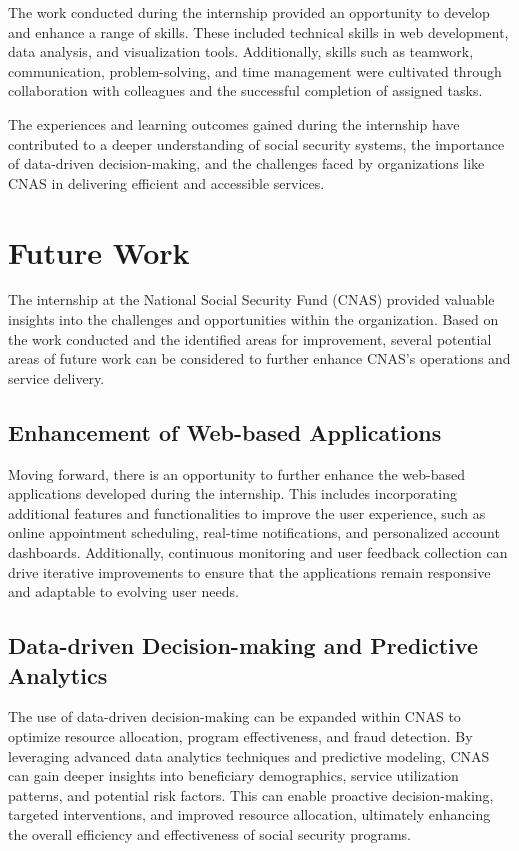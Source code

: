 The work conducted during the internship provided an opportunity to develop and enhance a range of skills. These included technical skills in web development, data analysis, and visualization tools. Additionally, skills such as teamwork, communication, problem-solving, and time management were cultivated through collaboration with colleagues and the successful completion of assigned tasks.

The experiences and learning outcomes gained during the internship have contributed to a deeper understanding of social security systems, the importance of data-driven decision-making, and the challenges faced by organizations like CNAS in delivering efficient and accessible services.

\chapter{Future Work}
\label{chap:future-work}

The internship at the National Social Security Fund (CNAS) provided valuable insights into the challenges and opportunities within the organization. Based on the work conducted and the identified areas for improvement, several potential areas of future work can be considered to further enhance CNAS's operations and service delivery.

\section{Enhancement of Web-based Applications}
\label{sec:web-apps}

Moving forward, there is an opportunity to further enhance the web-based applications developed during the internship. This includes incorporating additional features and functionalities to improve the user experience, such as online appointment scheduling, real-time notifications, and personalized account dashboards. Additionally, continuous monitoring and user feedback collection can drive iterative improvements to ensure that the applications remain responsive and adaptable to evolving user needs.

\section{Data-driven Decision-making and Predictive Analytics}
\label{sec:data-analytics}

The use of data-driven decision-making can be expanded within CNAS to optimize resource allocation, program effectiveness, and fraud detection. By leveraging advanced data analytics techniques and predictive modeling, CNAS can gain deeper insights into beneficiary demographics, service utilization patterns, and potential risk factors. This can enable proactive decision-making, targeted interventions, and improved resource allocation, ultimately enhancing the overall efficiency and effectiveness of social security programs.

